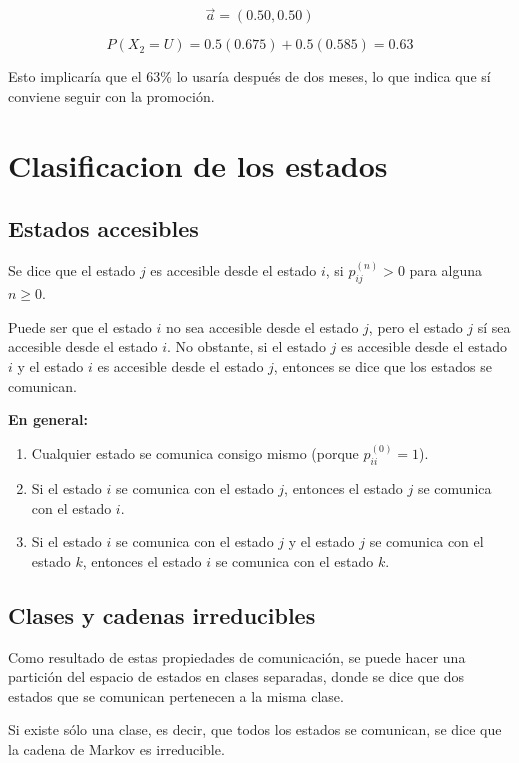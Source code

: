 \documentclass{article}
\begin{document}
\[
    \vec{a} = (0.50, 0.50)
\]

\[
    P(X_{2} = U) = 0.5(0.675) + 0.5(0.585) = 0.63
\]

Esto implicaría que el 63\% lo usaría después de dos meses, lo que indica que sí conviene seguir con la promoción.

\section{Clasificacion de los estados}

\subsection*{Estados accesibles}
Se dice que el estado \( j \) es accesible desde el estado \( i \), si \( p_{ij}^{(n)} > 0 \) para alguna \( n \geq 0 \).

\vspace{.25cm}

Puede ser que el estado \( i \) no sea accesible desde el estado \( j \), pero el estado \( j \) sí sea accesible desde el estado \( i \). No obstante, si el estado \( j \) es accesible desde el estado \( i \) y el estado \( i \) es accesible desde el estado \( j \), entonces se dice que los estados se comunican.

\textbf{En general:}

\begin{enumerate}
    \item Cualquier estado se comunica consigo mismo (porque \( p_{ii}^{(0)} = 1 \)).
    \item Si el estado \( i \) se comunica con el estado \( j \), entonces el estado \( j \) se comunica con el estado \( i \).
    \item Si el estado \( i \) se comunica con el estado \( j \) y el estado \( j \) se comunica con el estado \( k \), entonces el estado \( i \) se comunica con el estado \( k \).
\end{enumerate}

\subsection*{Clases y cadenas irreducibles}

Como resultado de estas propiedades de comunicación, se puede hacer una partición del espacio de estados en clases separadas, donde se dice que dos estados que se comunican pertenecen a la misma clase.

Si existe sólo una clase, es decir, que todos los estados se comunican, se dice que la cadena de Markov es irreducible.
\end{document}
